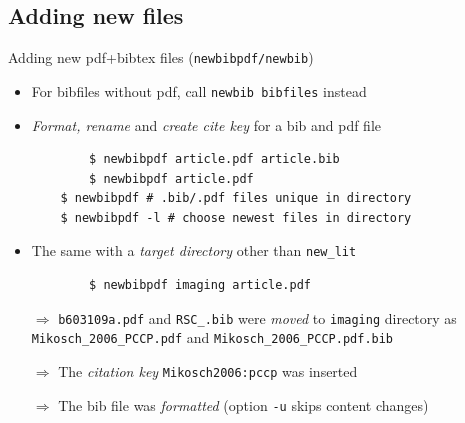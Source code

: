 \documentclass[xcolor={table,dvipsnames}]{beamer}
\renewcommand{\emph}[1]{\textit{\color{orange!90!brown}#1}}
\newcommand{\faint}{\color{black!10!gray}}
\begin{document}
\subsection{Adding new files}
\begin{frame}[fragile]{Adding new pdf+bibtex files (\texttt{newbibpdf/newbib})}
  \begin{itemize}

    \item For bibfiles without pdf, call \texttt{\color{darkred}newbib bibfiles} instead

    \item \emph{Format, rename} and \emph{create cite key} for a bib and pdf file\\
      \begin{lstlisting}
        $ newbibpdf article.pdf article.bib
        $ newbibpdf article.pdf
	$ newbibpdf # .bib/.pdf files unique in directory
	$ newbibpdf -l # choose newest files in directory
      \end{lstlisting}

    \item The same with a \emph{target directory} other than \verb!new_lit!
      \begin{lstlisting}
        $ newbibpdf imaging article.pdf
      \end{lstlisting}

    \item[$\Rightarrow$] {\faint\verb!b603109a.pdf!} and {\faint\verb!RSC_.bib!}
      were \emph{moved} to {\faint\verb!imaging!} directory as
      {\faint\verb!Mikosch_2006_PCCP.pdf!} and
      {\faint\verb!Mikosch_2006_PCCP.pdf.bib!}

    \item[$\Rightarrow$] The \emph{citation key} {\faint\verb!Mikosch2006:pccp!} was inserted

    \item[$\Rightarrow$] The bib file was \emph{formatted}
      (option {\faint\verb!-u!} skips content changes)

  \end{itemize}
\end{frame}
\end{document}
